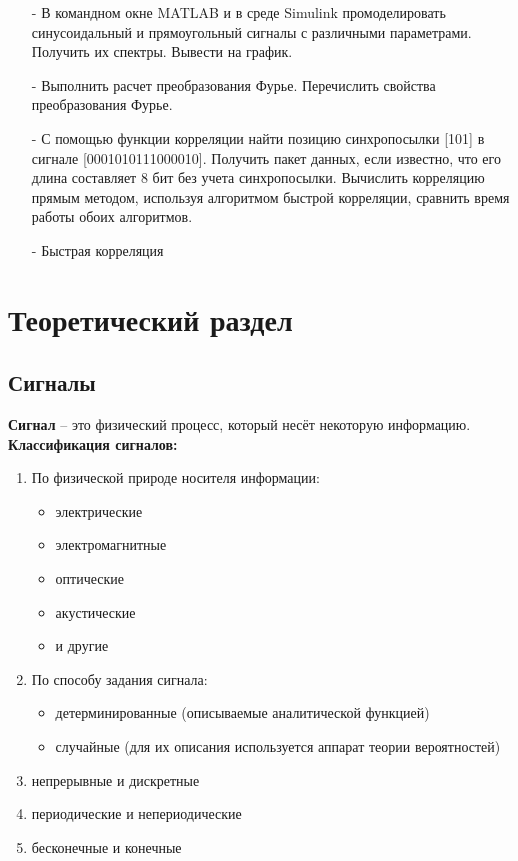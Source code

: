 \documentclass[a4paper,14pt]{extarticle}
\begin{document}
\begin{itemize}
\item[-]
В командном окне MATLAB и в среде Simulink промоделировать синусоидальный и прямоугольный сигналы с различными параметрами. Получить их спектры. Вывести на график.

\item[-]
Выполнить расчет преобразования Фурье. Перечислить свойства
преобразования Фурье.

\item[-]
С помощью функции корреляции найти позицию синхропосылки [101] в сигнале [0001010111000010]. Получить пакет
данных, если известно, что его длина составляет 8 бит без
учета синхропосылки. Вычислить корреляцию прямым методом, используя алгоритмом быстрой корреляции, сравнить время работы обоих алгоритмов.

\item[-]
Быстрая корреляция
\end{itemize}

\section{Теоретический раздел}

\subsection{Сигналы}

\textbf{Сигнал} -- это физический процесс, который несёт некоторую информацию.\\

\textbf{Классификация сигналов:}
\begin{enumerate}
\item По физической природе носителя информации:
	\begin{itemize}
	\item электрические
	\item электромагнитные
	\item оптические
	\item акустические
	\item и другие
	\end{itemize}
\item По способу задания сигнала:
	\begin{itemize}
	\item детерминированные (описываемые аналитической функцией)
	\item случайные (для их описания используется аппарат теории вероятностей)
	\end{itemize}
\item непрерывные и дискретные 
\item периодические и непериодические
\item бесконечные и конечные
\end{enumerate}
\end{document}
